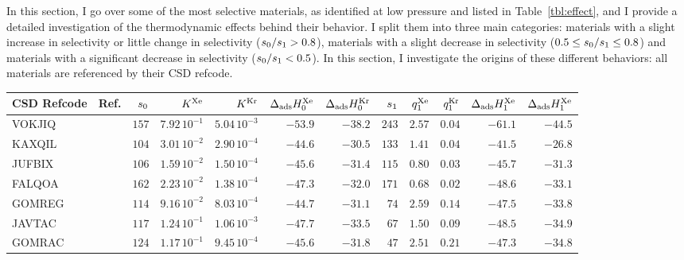 \documentclass[main.tex]{subfiles}
\begin{document}
In this section, I go over some of the most selective materials, as identified at low pressure and listed in Table~\ref{tbl:effect}, and I provide a detailed investigation of the thermodynamic effects behind their behavior. I split them into three main categories: materials with a slight increase in selectivity or little change in selectivity ($s_{\text{0}}/s_{\text{1}} > 0.8$), materials with a slight decrease in selectivity ($0.5 \le s_{\text{0}}/s_{\text{1}} \le 0.8$) and materials with a significant decrease in selectivity ($s_{\text{0}}/s_{\text{1}} < 0.5$). In this section, I investigate the origins of these different behaviors: all materials are referenced by their CSD refcode.

  
\begin{table}[hb]
  \centering
  \fontsize{8.5}{10.5}\selectfont
  \setlength{\extrarowheight}{1pt}
    \begin{tabular}{|lr|rrrrr|rrrrr|}
    \hline
          CSD Refcode & Ref. &  $s_{\text{0}}$ &  $K^{\text{Xe}}$ &  $K^{\text{Kr}}$ &  $\Delta_{\text{ads}}H^{\text{Xe}}_{\text{0}}$ &  $\Delta_{\text{ads}}H^{\text{Kr}}_{\text{0}}$  &  $s_{\text{1}}$ &  $q^{\text{Xe}}_{\text{1}}$ &  $q^{\text{Kr}}_{\text{1}}$ &  $\Delta_{\text{ads}}H^{\text{Xe}}_{\text{1}}$ &  $\Delta_{\text{ads}}H^{\text{Xe}}_{\text{1}}$ \\
    \hline
        VOKJIQ &~\cite{VOKJIQ}        &  $157$  &  $7.92\,10^{-1}$  &  $5.04\,10^{-3}$  &  $-53.9$  &  $-38.2$  &  $243$  &  $2.57$  &  $0.04$  &  $-61.1$  &  $-44.5$  \\
        KAXQIL &~\cite{KAXQIL}        &  $104$  &  $3.01\,10^{-2}$  &  $2.90\,10^{-4}$  &  $-44.6$  &  $-30.5$  &  $133$  &  $1.41$  &  $0.04$  &  $-41.5$  &  $-26.8$  \\
        JUFBIX &~\cite{JUFBIX}        &  $106$  &  $1.59\,10^{-2}$  &  $1.50\,10^{-4}$  &  $-45.6$  &  $-31.4$  &  $115$  &  $0.80$  &  $0.03$  &  $-45.7$  &  $-31.3$  \\
        FALQOA &~\cite{FALQOA}        &  $162$  &  $2.23\,10^{-2}$  &  $1.38\,10^{-4}$  &  $-47.3$  &  $-32.0$  &  $171$  &  $0.68$  &  $0.02$  &  $-48.6$  &  $-33.1$  \\
        GOMREG &~\cite{GOMREG_GOMRAC} &  $114$  &  $9.16\,10^{-2}$  &  $8.03\,10^{-4}$  &  $-44.7$  &  $-31.1$  &  $ 74$  &  $2.59$  &  $0.14$  &  $-47.5$  &  $-33.8$  \\
        JAVTAC &~\cite{JAVTAC}        &  $117$  &  $1.24\,10^{-1}$  &  $1.06\,10^{-3}$  &  $-47.7$  &  $-33.5$  &  $ 67$  &  $1.50$  &  $0.09$  &  $-48.5$  &  $-34.9$  \\
        GOMRAC &~\cite{GOMREG_GOMRAC} &  $124$  &  $1.17\,10^{-1}$  &  $9.45\,10^{-4}$  &  $-45.6$  &  $-31.8$  &  $ 47$  &  $2.51$  &  $0.21$  &  $-47.3$  &  $-34.8$  \\

\end{tabular}
\end{table}
\end{document}
